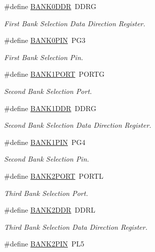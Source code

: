 \begin{DoxyCompactItemize}
\#define \hyperlink{group__config_gafba0bbf9336cfc754622a5e9b3d12d80}{B\-A\-N\-K0\-D\-D\-R}~D\-D\-R\-G
\begin{DoxyCompactList}\small\item\em First Bank Selection Data Direction Register. \end{DoxyCompactList}\item 
\#define \hyperlink{group__config_gaa176e9b2752f764cd7e7d9fd49d46af8}{B\-A\-N\-K0\-P\-I\-N}~P\-G3
\begin{DoxyCompactList}\small\item\em First Bank Selection Pin. \end{DoxyCompactList}\item 
\#define \hyperlink{group__config_ga8b3ee7126196f6e939989eae097c3ac4}{B\-A\-N\-K1\-P\-O\-R\-T}~P\-O\-R\-T\-G
\begin{DoxyCompactList}\small\item\em Second Bank Selection Port. \end{DoxyCompactList}\item 
\#define \hyperlink{group__config_gada13cb9312072b48628763a6e1fd50d3}{B\-A\-N\-K1\-D\-D\-R}~D\-D\-R\-G
\begin{DoxyCompactList}\small\item\em Second Bank Selection Data Direction Register. \end{DoxyCompactList}\item 
\#define \hyperlink{group__config_gacfebedc2067e3c52e6ae1f627afcc1e1}{B\-A\-N\-K1\-P\-I\-N}~P\-G4
\begin{DoxyCompactList}\small\item\em Second Bank Selection Pin. \end{DoxyCompactList}\item 
\#define \hyperlink{group__config_gad35afb0251524c201c2d60f3d035af32}{B\-A\-N\-K2\-P\-O\-R\-T}~P\-O\-R\-T\-L
\begin{DoxyCompactList}\small\item\em Third Bank Selection Port. \end{DoxyCompactList}\item 
\#define \hyperlink{group__config_ga62f56230c5f5f7220c44ab1c93d677ab}{B\-A\-N\-K2\-D\-D\-R}~D\-D\-R\-L
\begin{DoxyCompactList}\small\item\em Third Bank Selection Data Direction Register. \end{DoxyCompactList}\item 
\#define \hyperlink{group__config_ga74c95f6ccdb5e482e97a5af53ed74229}{B\-A\-N\-K2\-P\-I\-N}~P\-L5

\end{DoxyCompactItemize}
